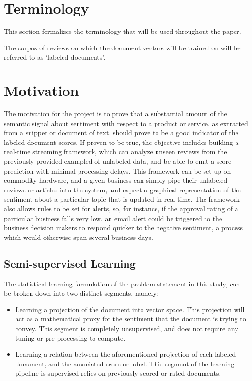\documentclass[conference]{IEEEtran}
\begin{document}
\section{Terminology}
This section formalizes the terminology that will be used throughout the paper.

The corpus of reviews on which the document vectors will be trained on will be referred to as `labeled documents'.

\section{Motivation}
The motivation for the project is to prove that a substantial amount of the semantic signal about sentiment with respect to a product or service, as extracted from a snippet or document of text, should prove to be a good indicator of the labeled document scores. If proven to be true, the objective includes building a real-time streaming framework, which can analyze unseen reviews from the previously provided exampled of unlabeled data, and be able to emit a score-prediction with minimal processing delays. This framework can be set-up on commodity hardware, and a given business can simply pipe their unlabeled reviews or articles into the system, and expect a graphical representation of the sentiment about a particular topic that is updated in real-time. The framework also allows rules to be set for alerts, so, for instance, if the approval rating of a particular business falls very low, an email alert could be triggered to the business decision makers to respond quicker to the negative sentiment, a process which would otherwise span several business days.

\subsection{Semi-supervised Learning}
The statistical learning formulation of the problem statement in this study, can be broken down into two distinct segments, namely:
\begin{itemize}
	\item Learning a projection of the document into vector space. This projection will act as a mathematical proxy for the sentiment that the document is trying to convey. This segment is completely unsupervised, and does not require any tuning or pre-processing to compute.
  \item Learning a relation between the aforementioned projection of each labeled document, and the associated score or label. This segment of the learning pipeline is supervised relies on previously scored or rated documents.
\end{itemize}
\end{document}
